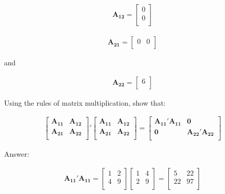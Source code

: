 \documentclass[12pt]{article}
\begin{document}
\begin{eqnarray*}
\mathbf{A_{12}}=
\begin{bmatrix} 
0\\
0\\
\end{bmatrix}
\end{eqnarray*}

\begin{eqnarray*}
\mathbf{A_{21}}=
\begin{bmatrix} 
0 & 0\\
\end{bmatrix}
\end{eqnarray*}

and


\begin{eqnarray*}
\mathbf{A_{22}}=
\begin{bmatrix} 
6\\
\end{bmatrix}
\end{eqnarray*}

Using the rules of matrix multiplication, show that:

\begin{eqnarray*}
\begin{bmatrix} 
\mathbf{A_{11}} & \mathbf{A_{12}}  \\
\mathbf{A_{21}} & \mathbf{A_{22}}  \\
\end{bmatrix}'
\begin{bmatrix} 
\mathbf{A_{11}} & \mathbf{A_{12}}  \\
\mathbf{A_{21}} & \mathbf{A_{22}}  \\
\end{bmatrix} = 
\begin{bmatrix} 
\mathbf{A_{11}' A_{11}} & \mathbf{0} \\
\mathbf{0}& \mathbf{A_{22}'A_{22}}  \\
\end{bmatrix} 
\end{eqnarray*}

\bigskip

Answer:

\begin{eqnarray*}
 \mathbf{A_{11}'A_{11}}=
\begin{bmatrix}
1&2  \\
4&9  \\
\end{bmatrix}
\begin{bmatrix}
1&4 \\
2&9  \\
\end{bmatrix}=
\begin{bmatrix}
5&22 \\
22&97  \\
\end{bmatrix}
\end{eqnarray*}
\end{document}
